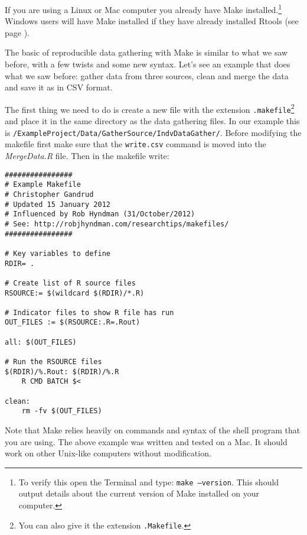 If you are using a Linux or Mac computer you already have Make installed.\footnote{To verify this open the Terminal and type: \texttt{make --version}. This should output details about the current version of Make installed on your computer.} Windows users will have Make installed if they have already installed Rtools (see page \pageref{RtoolsDownload}).

The basic of reproducible data gathering with Make is similar to what we saw before, with a few twists and some new syntax. Let's see an example that does what we saw before: gather data from three sources, clean and merge the data and save it as in CSV format. 

The first thing we need to do is create a new file with the extension \texttt{.makefile}\footnote{You can also give it the extension \texttt{.Makefile}.} and place it in the same directory as the data gathering files. In our example this is \texttt{/ExampleProject/Data/GatherSource/IndvDataGather/}. Before modifying the makefile first make sure that the \texttt{write.csv} command is moved into the \emph{MergeData.R} file. Then in the makefile write:

\begin{knitrout}
\color{fgcolor}\begin{kframe}
\begin{verbatim}
################
# Example Makefile
# Christopher Gandrud
# Updated 15 January 2012
# Influenced by Rob Hyndman (31/October/2012)
# See: http://robjhyndman.com/researchtips/makefiles/
################

# Key variables to define
RDIR= .

# Create list of R source files
RSOURCE:= $(wildcard $(RDIR)/*.R)

# Indicator files to show R file has run
OUT_FILES := $(RSOURCE:.R=.Rout)

all: $(OUT_FILES) 

# Run the RSOURCE files
$(RDIR)/%.Rout: $(RDIR)/%.R
	R CMD BATCH $<

clean: 
	rm -fv $(OUT_FILES)
\end{verbatim}
\end{kframe}
\end{knitrout}



Note that Make relies heavily on commands and syntax of the shell program that you are using. The above example was written and tested on a Mac. It should work on other Unix-like computers without modification.

